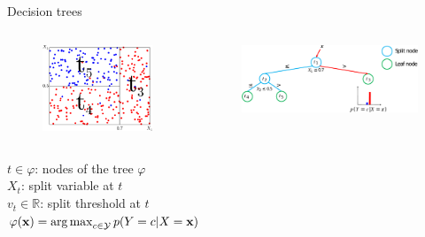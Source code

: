 \documentclass{beamer}
\DeclareMathOperator*{\argmax}{arg\,max}
\begin{document}
\begin{frame}{Decision trees}
\begin{columns}
\begin{column}{0.3\textwidth}
\begin{figure}
\includegraphics[width=\textwidth]{./figures/tree-partition-d.pdf}
\end{figure}
\end{column}
\begin{column}{0.7\textwidth}
\begin{figure}
\includegraphics[width=\textwidth]{./figures/tree-simple.pdf}
\end{figure}
\end{column}
\end{columns}

\vspace{1cm}

$t \in \varphi$: nodes of the tree $\varphi$\\
$X_t$: split variable at $t$ \\
$v_t \in \mathbb{R}$: split threshold at $t$\\
$\varphi(\mathbf{x}) = \argmax_{c \in {\cal Y}} p(Y = c | X = \mathbf{x})$
\end{frame}
\end{document}
